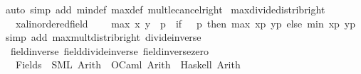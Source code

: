 \begin{isabellebody}
%
\isadelimproof
%
\endisadelimproof
%
\isatagproof
{}\isamarkupfalse%
\ {\isacharparenleft}{\kern0pt}auto\ simp\ add{\isacharcolon}{\kern0pt}\ min{\isacharunderscore}{\kern0pt}def\ max{\isacharunderscore}{\kern0pt}def\ mult{\isacharunderscore}{\kern0pt}le{\isacharunderscore}{\kern0pt}cancel{\isacharunderscore}{\kern0pt}right{\isacharparenright}{\kern0pt}%
\endisatagproof
{\isafoldproof}%
%
\isadelimproof
\isanewline
%
\endisadelimproof
\isanewline
{}\isamarkupfalse%
\ max{\isacharunderscore}{\kern0pt}divide{\isacharunderscore}{\kern0pt}distrib{\isacharunderscore}{\kern0pt}right{\isacharcolon}{\kern0pt}\isanewline
\ \ \ x{\isacharcolon}{\kern0pt}{\isacharcolon}{\kern0pt}{\isachardoublequoteopen}{\isacharprime}{\kern0pt}a{\isacharcolon}{\kern0pt}{\isacharcolon}{\kern0pt}linordered{\isacharunderscore}{\kern0pt}field{\isachardoublequoteclose}\ \isanewline
\ \ \ {\isachardoublequoteopen}max\ x\ y\ {\isacharslash}{\kern0pt}\ p\ {\isacharequal}{\kern0pt}\ {\isacharparenleft}{\kern0pt}if\ {}\ {\isasymle}\ p\ then\ max\ {\isacharparenleft}{\kern0pt}x{\isacharslash}{\kern0pt}p{\isacharparenright}{\kern0pt}\ {\isacharparenleft}{\kern0pt}y{\isacharslash}{\kern0pt}p{\isacharparenright}{\kern0pt}\ else\ min\ {\isacharparenleft}{\kern0pt}x{\isacharslash}{\kern0pt}p{\isacharparenright}{\kern0pt}\ {\isacharparenleft}{\kern0pt}y{\isacharslash}{\kern0pt}p{\isacharparenright}{\kern0pt}{\isacharparenright}{\kern0pt}{\isachardoublequoteclose}\isanewline
%
\isadelimproof
%
\endisadelimproof
%
\isatagproof
{}\isamarkupfalse%
\ {\isacharparenleft}{\kern0pt}simp\ add{\isacharcolon}{\kern0pt}\ max{\isacharunderscore}{\kern0pt}mult{\isacharunderscore}{\kern0pt}distrib{\isacharunderscore}{\kern0pt}right\ divide{\isacharunderscore}{\kern0pt}inverse{\isacharparenright}{\kern0pt}%
\endisatagproof
{\isafoldproof}%
%
\isadelimproof
\isanewline
%
\endisadelimproof
\isanewline
{}\isamarkupfalse%
\ {\isacharparenleft}{\kern0pt}\ field{\isacharunderscore}{\kern0pt}inverse\ field{\isacharunderscore}{\kern0pt}divide{\isacharunderscore}{\kern0pt}inverse\ field{\isacharunderscore}{\kern0pt}inverse{\isacharunderscore}{\kern0pt}zero\isanewline
\isanewline
{}\isamarkupfalse%
\isanewline
\ \ \ Fields\ {\isasymrightharpoonup}\ {\isacharparenleft}{\kern0pt}SML{\isacharparenright}{\kern0pt}\ Arith\ \ {\isacharparenleft}{\kern0pt}OCaml{\isacharparenright}{\kern0pt}\ Arith\ \ {\isacharparenleft}{\kern0pt}Haskell{\isacharparenright}{\kern0pt}\ Arith\isanewline
%
\isadelimtheory
\isanewline
%
\endisadelimtheory
%
\isatagtheory
{}\isamarkupfalse%
%
\endisatagtheory
{\isafoldtheory}%
%
\isadelimtheory
%
\endisadelimtheory
%
\end{isabellebody}%

